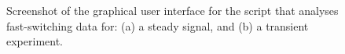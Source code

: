 \begin{figure}%
\centering
{}

\caption[Screenshot of the graphical user interface for the script that  analyses  fast-switching data]{Screenshot of the graphical user interface for the script that  analyses  fast-switching data for: (a)  a steady signal, and (b) a transient experiment.}
\label{fig:fss}
\end{figure}

